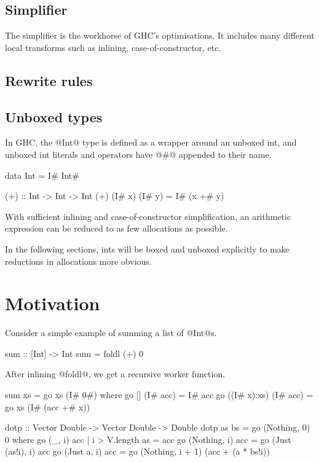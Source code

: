 \documentclass{tmr}
\begin{document}
\subsection{Simplifier}
The simplifier is the workhorse of GHC's optimisations.
It includes many different local transforms such as inlining, case-of-constructor, etc.


\subsection{Rewrite rules}

\subsection{Unboxed types}
In GHC, the @Int@ type is defined as a wrapper around an unboxed int,
and unboxed int literals and operators have @#@ appended to their name.

\begin{code}
data Int = I# Int#

(+) :: Int -> Int -> Int
(+) (I# x) (I# y) = I# (x +# y)
\end{code}

With sufficient inlining and case-of-constructor simplification,
an arithmetic expression can be reduced to as few allocations as possible.

In the following sections, ints will be boxed and unboxed explicitly to make reductions in allocations more obvious.

\section{Motivation}
Consider a simple example of summing a list of @Int@s.
\begin{code}
sum :: [Int] -> Int
sum = foldl (+) 0
\end{code}

After inlining @foldl@, we get a recursive worker function.
\begin{code}
sum xs = go xs (I# 0#)
 where
  go []          (I# acc) = I# acc
  go ((I# x):xs) (I# acc) = go xs (I# (acc +# x))
\end{code}



\begin{code}
dotp :: Vector Double -> Vector Double -> Double
dotp as bs = go (Nothing, 0) 0
 where
  go (_, i) acc
   | i > V.length as
   = acc
  go (Nothing, i) acc
   = go (Just (as!i), i) acc
  go (Just a, i) acc
   = go (Nothing, i + 1) (acc + (a * bs!i))
\end{code}
\end{document}
